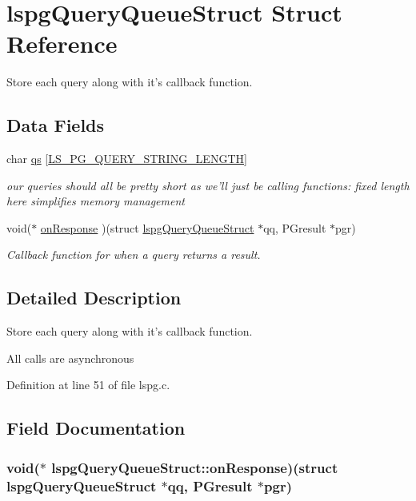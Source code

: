 \hypertarget{structlspgQueryQueueStruct}{\section{lspg\-Query\-Queue\-Struct Struct Reference}
\label{structlspgQueryQueueStruct}
}


Store each query along with it's callback function.  


\subsection*{Data Fields}
\begin{DoxyCompactItemize}
\item 
char \hyperlink{structlspgQueryQueueStruct_abf8c9c581b38a5e3e269eda69e47de15}{qs} \mbox{[}\hyperlink{pgpmac_8h_a3a8ef1b4b5994d6dd12bf74454ea891b}{L\-S\-\_\-\-P\-G\-\_\-\-Q\-U\-E\-R\-Y\-\_\-\-S\-T\-R\-I\-N\-G\-\_\-\-L\-E\-N\-G\-T\-H}\mbox{]}
\begin{DoxyCompactList}\small\item\em our queries should all be pretty short as we'll just be calling functions\-: fixed length here simplifies memory management \end{DoxyCompactList}\item 
void($\ast$ \hyperlink{structlspgQueryQueueStruct_a53bac5ae4cab775423940bff5092a831}{on\-Response} )(struct \hyperlink{structlspgQueryQueueStruct}{lspg\-Query\-Queue\-Struct} $\ast$qq, P\-Gresult $\ast$pgr)
\begin{DoxyCompactList}\small\item\em Callback function for when a query returns a result. \end{DoxyCompactList}\end{DoxyCompactItemize}


\subsection{Detailed Description}
Store each query along with it's callback function. 

All calls are asynchronous 

Definition at line 51 of file lspg.\-c.



\subsection{Field Documentation}
\hypertarget{structlspgQueryQueueStruct_a53bac5ae4cab775423940bff5092a831}{
\subsubsection[{on\-Response}]{\setlength{\rightskip}{0pt plus 5cm}void($\ast$ lspg\-Query\-Queue\-Struct\-::on\-Response)(struct {\bf lspg\-Query\-Queue\-Struct} $\ast$qq, P\-Gresult $\ast$pgr)}}\label{structlspgQueryQueueStruct_a53bac5ae4cab775423940bff5092a831}


